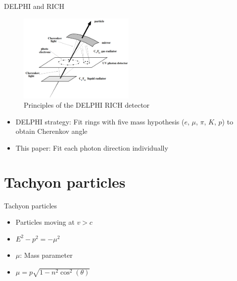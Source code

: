 \documentclass{beamer}
\begin{document}
\begin{frame}{DELPHI and RICH}
  \begin{figure}
    \centering
    \includegraphics[width = 0.50\textwidth]{Cherenkov.png}
    \caption{Principles of the DELPHI RICH detector}
  \end{figure}
  \begin{itemize}
    \item{DELPHI strategy: Fit rings with five mass hypothesis ($e$, $\mu$, $\pi$, $K$, $p$) to obtain Cherenkov angle}
    \item{This paper: Fit each photon direction individually}
  \end{itemize}
\end{frame}

\section{Tachyon particles}
\begin{frame}{Tachyon particles}
  \begin{itemize}
    \item{Particles moving at $v > c$}
    \item{$E^2 - p^2 = -\mu^2$}
    \item{$\mu$: Mass parameter}
    \item{$\mu = p\sqrt{1 - n^2\cos^2(\theta)}$}
  \end{itemize}
\end{frame}
\end{document}
